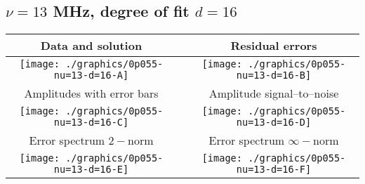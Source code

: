 

% 

\clearpage{}
\break{}

\subsection{$\nu = 13$ MHz, degree of fit $d = 16$}

\begin{table}[h]
    \begin{center}
        \begin{tabular}{ccc}
            Data and solution & \quad & Residual errors \\\hline
            \texttt{[image: ./graphics/0p055-nu=13-d=16-A]} &&
            \texttt{[image: ./graphics/0p055-nu=13-d=16-B]} \\[15pt]
            Amplitudes with error bars && Amplitude signal--to--noise \\\hline
            \texttt{[image: ./graphics/0p055-nu=13-d=16-C]} &&
            \texttt{[image: ./graphics/0p055-nu=13-d=16-D]} \\[15pt]
            Error spectrum $2-$norm && Error spectrum $\infty-$norm \\\hline
            \texttt{[image: ./graphics/0p055-nu=13-d=16-E]} &&
            \texttt{[image: ./graphics/0p055-nu=13-d=16-F]} \\[15pt]
        \end{tabular}
    \end{center}
\label{fig:elev=55, nu=13}
\end{table}



\endinput
